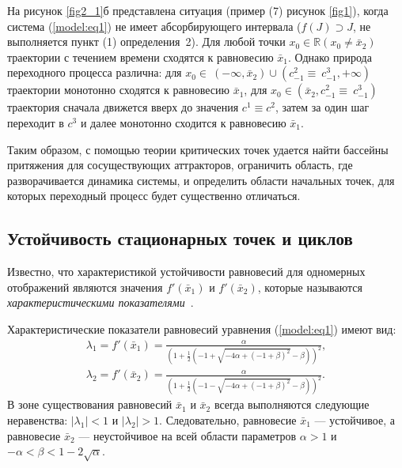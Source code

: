 \documentclass[a4paper, 14pt]{extreport}
\newcommand\abs[1]{\left|#1\right|}
\numberwithin{equation}{section}
\numberwithin{figure}{section}
\numberwithin{table}{section}
\begin{document}
		На рисунок \ref{fig2_1}б представлена ситуация (пример (7) рисунок \ref{fig1}), когда система (\ref{model:eq1}) не имеет абсорбирующего интервала ($ f(J) \supset J $, не выполняется пункт (1) определения~2). Для любой точки $ x_{0} \in \mathbb{R} (x_{0} \neq \bar{x}_{2}) $ траектории с течением времени сходятся к равновесию $ \bar{x}_{1} $. Однако природа переходного процесса различна: для $ x_{0} \in~(-\infty, \bar{x}_{2}) \cup (c^{2}_{-1} \equiv~c^{3}_{-1}, +\infty) $ траектории монотонно сходятся к равновесию $ \bar{x}_{1} $, для $ x_{0} \in (\bar{x}_{2}, c^{2}_{-1} \equiv~c^{3}_{-1}) $ траектория сначала движется вверх до значения $ c^{1} \equiv c^{2} $, затем за один шаг переходит в $ c^{3} $ и далее монотонно сходится к равновесию $ \bar{x}_{1} $. %

		Таким образом, с помощью теории критических точек удается найти бассейны притяжения для сосуществующих аттракторов, ограничить область, где разворачивается динамика системы, и определить области начальных точек, для которых переходный процесс будет существенно отличаться. %
	
	\subsection{Устойчивость стационарных точек и циклов}
	\label{attractors_stability}
		Известно, что характеристикой устойчивости равновесий для одномерных отображений являются значения $ f'(\bar{x}_{1}) $ и $ f'(\bar{x}_{2}) $, которые называются {\it характеристическими показателями}~\cite{VasinRyashko2003}. %

		Характеристические показатели равновесий уравнения (\ref{model:eq1}) имеют вид:
		\begin{equation}
			\begin{array}{l}
				\lambda_{1} = f'(\bar{x}_{1}) = \frac{\alpha}{\left(1+\frac{1}{2} \left(-1+\sqrt{-4 \alpha+(-1+\beta)^2}-\beta\right)\right)^2}, \\[3mm]
				\lambda_{2} = f'(\bar{x}_{2}) =  \frac{\alpha}{\left(1+\frac{1}{2} \left(-1-\sqrt{-4 \alpha+(-1+\beta)^2}-\beta\right)\right)^2}.
			\end{array}
		\end{equation}
		В зоне существования равновесий $ \bar{x}_{1} $ и $ \bar{x}_{2} $ всегда выполняются следующие неравенства: $ \abs{\lambda_{1}} < 1 $ и $  \abs{\lambda_{2}} > 1 $. Следовательно, равновесие $ \bar{x}_{1} $ --- устойчивое, а равновесие $ \bar{x}_{2} $ --- неустойчивое на всей области параметров $ \alpha > 1 $ и $- \alpha < \beta < 1 - 2 \sqrt{\alpha} $. %
		
\end{document}
